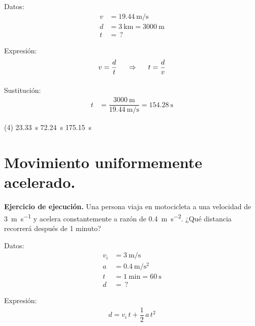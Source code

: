 \documentclass[12pt, letter]{exam}
\begin{document}
\begin{questions}
    \begin{minipage}[t]{0.35\linewidth}
    Datos: 
    \begin{align*}
    v &= \SI{19.44}{\meter\per\second} \\
    d &= \SI{3}{\kilo\meter} = \SI{3000}{\meter} \\
    t &= \, ?
    \end{align*}
    \end{minipage}
    \hspace{1cm}
    \begin{minipage}[t]{0.4\linewidth}
    Expresión:
    \begin{align*}
    v &= \dfrac{d}{t} \hspace{0.5cm} \Rightarrow \hspace{0.5cm} t = \dfrac{d}{v} \\[0.5em]
    \end{align*}
    \end{minipage}

    Sustitución:
    \begin{align*}
    t &= \dfrac{\SI{3000}{\meter}}{\displaystyle \SI[per-mode=fraction]{19.44}{\meter\per\second}} = \SI{154.28}{\second}
    \end{align*}
    \begin{tasks}(4)
        \task \SI{23.33}{\second}
        \task \SI{72.24}{\second}
        \task {}
        \task \SI{175.15}{\second}
    \end{tasks}


    \section{Movimiento uniformemente acelerado.}

    \setcounter{question}{7} \question \label{Ejercicio_04} \textbf{Ejercicio de ejecución. } Una persona viaja en motocicleta a una velocidad de \SI{3}{\meter\per\second} y acelera constantemente a razón de \SI{0.4}{\meter\per\square\second}. ¿Qué distancia recorrerá después de 1 minuto?
    
    \begin{minipage}[t]{0.35\linewidth}
    Datos: 
    \begin{align*}
    v_{i} &= \SI{3}{\meter\per\second} \\
    a &= \SI{0.4}{\meter\per\square\second} \\
    t &= \SI{1}{\minute} = \SI{60}{\second} \\
    d &= \, ?
    \end{align*}
    \end{minipage}
    \hspace{1cm}
    \begin{minipage}[t]{0.4\linewidth}
    Expresión:
    \begin{align*}
    d = v_{i} \, t + \dfrac{1}{2} \, a \, t^{2}
    \end{align*}
    \end{minipage}


\end{questions}
\end{document}
